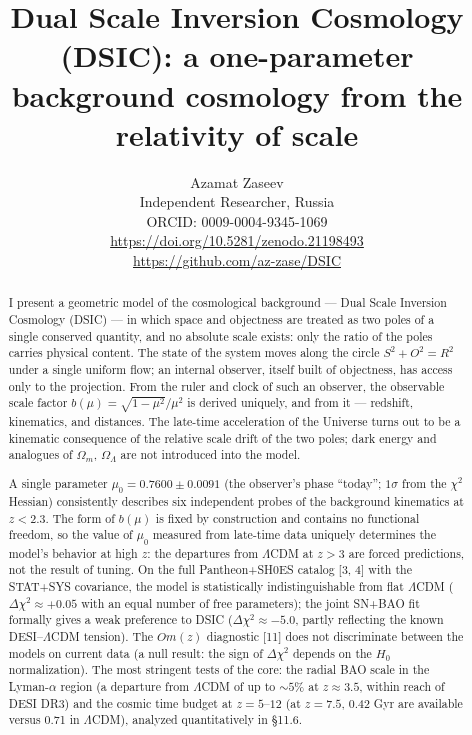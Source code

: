 \documentclass{article}
\begin{document}
\title{Dual Scale Inversion Cosmology (DSIC): a one-parameter background cosmology from the relativity of scale}

\author{Azamat Zaseev\\
Independent Researcher, Russia\\
ORCID: 0009-0004-9345-1069\\
\url{https://doi.org/10.5281/zenodo.21198493}\\
\url{https://github.com/az-zase/DSIC}}

\date{}
\maketitle

\begin{abstract}
I present a geometric model of the cosmological background --- Dual Scale Inversion Cosmology (DSIC) --- in which space and objectness are treated as two poles of a single conserved quantity, and no absolute scale exists: only the ratio of the poles carries physical content. The state of the system moves along the circle $S^2 + O^2 = R^2$ under a single uniform flow; an internal observer, itself built of objectness, has access only to the projection. From the ruler and clock of such an observer, the observable scale factor $b(\mu) = \sqrt{1-\mu^2}/\mu^2$ is derived uniquely, and from it --- redshift, kinematics, and distances. The late-time acceleration of the Universe turns out to be a kinematic consequence of the relative scale drift of the two poles; dark energy and analogues of $\Omega_m$, $\Omega_\Lambda$ are not introduced into the model.

A single parameter $\mu_0 = 0.7600 \pm 0.0091$ (the observer's phase ``today''; $1\sigma$ from the $\chi^2$ Hessian) consistently describes six independent probes of the background kinematics at $z < 2.3$. The form of $b(\mu)$ is fixed by construction and contains no functional freedom, so the value of $\mu_0$ measured from late-time data uniquely determines the model's behavior at high $z$: the departures from $\Lambda$CDM at $z > 3$ are forced predictions, not the result of tuning. On the full Pantheon+SH0ES catalog [3, 4] with the STAT+SYS covariance, the model is statistically indistinguishable from flat $\Lambda$CDM ($\Delta\chi^2 \approx +0.05$ with an equal number of free parameters); the joint SN+BAO fit formally gives a weak preference to DSIC ($\Delta\chi^2 \approx -5.0$, partly reflecting the known DESI--$\Lambda$CDM tension). The $Om(z)$ diagnostic [11] does not discriminate between the models on current data (a null result: the sign of $\Delta\chi^2$ depends on the $H_0$ normalization). The most stringent tests of the core: the radial BAO scale in the Lyman-$\alpha$ region (a departure from $\Lambda$CDM of up to ${\sim}5\%$ at $z \approx 3.5$, within reach of DESI DR3) and the cosmic time budget at $z = 5\text{--}12$ (at $z = 7.5$, 0.42 Gyr are available versus 0.71 in $\Lambda$CDM), analyzed quantitatively in \S11.6.


\end{abstract}
\end{document}
